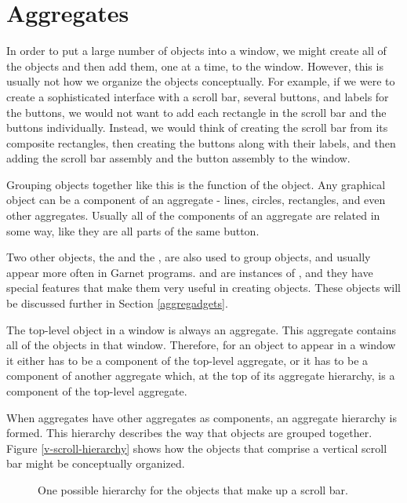 \section{Aggregates}
\label{aggregates}

In order to put a large number of objects into a window, we might
create all of the objects and then add them, one at a time, to the
window.  However, this is usually not how
we organize the objects conceptually.  For example, if we were to
create a sophisticated interface with a scroll bar, several buttons,
and labels for the buttons, we would not want to add each rectangle in
the scroll bar and the buttons individually.  Instead, we would think
of creating the scroll bar from its composite rectangles, then
creating the buttons along with their labels, and then adding the
scroll bar assembly and the button assembly to the window.

Grouping objects together like this is the function of the 
object.  Any graphical object can be a component of an aggregate - lines,
circles, rectangles, and even other aggregates.  Usually all of the
components of an aggregate are related in some way, like they are all
parts of the same button.

Two other objects, the  and the
, are also used to group objects, and usually appear more
often in Garnet programs.   and  are
instances of , and they have special features that make
them very useful in creating objects.  These objects will be discussed
further in Section \ref{aggregadgets}.

The top-level object in a window is always an aggregate.  This
aggregate contains all of the objects in that window.
Therefore, for an object to appear in a window it either has to be a
component of the top-level aggregate, or it has to be a component of
another aggregate which, at the top of its aggregate hierarchy, is a
component of the top-level aggregate.

When aggregates have other aggregates as components, an aggregate hierarchy
is formed.  This hierarchy describes the way that objects are grouped together.
Figure \ref{v-scroll-hierarchy} shows how the objects that comprise a
vertical scroll bar might be conceptually organized.

\begin{figure}
\begin{center}
                 \end{center}
\caption{One possible hierarchy for the objects that make up a scroll bar.}
\end{figure}

